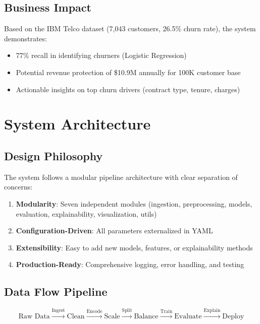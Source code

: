 \documentclass[11pt,a4paper]{article}
\begin{document}
\subsection{Business Impact}
Based on the IBM Telco dataset (7,043 customers, 26.5\% churn rate), the system demonstrates:
\begin{itemize}
    \item 77\% recall in identifying churners (Logistic Regression)
    \item Potential revenue protection of \$10.9M annually for 100K customer base
    \item Actionable insights on top churn drivers (contract type, tenure, charges)
\end{itemize}

\section{System Architecture}

\subsection{Design Philosophy}
The system follows a modular pipeline architecture with clear separation of concerns:

\begin{enumerate}
    \item \textbf{Modularity}: Seven independent modules (ingestion, preprocessing, models, evaluation, explainability, visualization, utils)
    \item \textbf{Configuration-Driven}: All parameters externalized in YAML
    \item \textbf{Extensibility}: Easy to add new models, features, or explainability methods
    \item \textbf{Production-Ready}: Comprehensive logging, error handling, and testing
\end{enumerate}

\subsection{Data Flow Pipeline}

\begin{equation}
\text{Raw Data} \xrightarrow{\text{Ingest}} \text{Clean} \xrightarrow{\text{Encode}} \text{Scale} \xrightarrow{\text{Split}} \text{Balance} \xrightarrow{\text{Train}} \text{Evaluate} \xrightarrow{\text{Explain}} \text{Deploy}
\end{equation}
\end{document}

